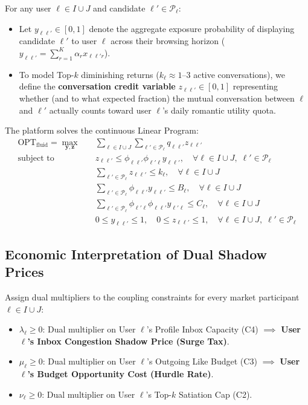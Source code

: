 \documentclass[11pt,letterpaper]{article}
\theoremstyle{definition}
\theoremstyle{plain}
\theoremstyle{remark}
\begin{document}
For any user $\ell \in I \cup J$ and candidate $\ell' \in \mathcal{P}_\ell$:
\begin{itemize}[leftmargin=1.5em]
    \item Let $y_{\ell\ell'} \in [0, 1]$ denote the aggregate exposure probability of displaying candidate $\ell'$ to user $\ell$ across their browsing horizon ($y_{\ell\ell'} = \sum_{r=1}^K \alpha_r x_{\ell\ell' r}$).
    \item To model Top-$k$ diminishing returns ($k_\ell \approx 1\text{--}3$ active conversations), we define the \textbf{conversation credit variable} $z_{\ell\ell'} \in [0, 1]$ representing whether (and to what expected fraction) the mutual conversation between $\ell$ and $\ell'$ actually counts toward user $\ell$'s daily romantic utility quota.
\end{itemize}

The platform solves the continuous Linear Program:
\begin{align}
    \mathrm{OPT}_{\text{fluid}} = \max_{\mathbf{y}, \mathbf{z}} \quad & \sum_{\ell \in I \cup J} \sum_{\ell' \in \mathcal{P}_\ell} q_{\ell\ell'} z_{\ell\ell'} \label{eq:fluid_obj} \\
    \text{subject to} \quad & z_{\ell\ell'} \le \phi_{\ell\ell'} \phi_{\ell'\ell} y_{\ell\ell'}, \quad \forall \ell \in I \cup J, \; \ell' \in \mathcal{P}_\ell \tag{C1: Realized Conversation Bound} \\
    & \sum_{\ell' \in \mathcal{P}_\ell} z_{\ell\ell'} \le k_\ell, \quad \forall \ell \in I \cup J \tag{C2: User Top-$k$ Satiation Cap} \\
    & \sum_{\ell' \in \mathcal{P}_\ell} \phi_{\ell\ell'} y_{\ell\ell'} \le B_\ell, \quad \forall \ell \in I \cup J \tag{C3: User Swiping Like Budget} \\
    & \sum_{\ell' \in \mathcal{P}_\ell} \phi_{\ell'\ell} \phi_{\ell\ell'} y_{\ell'\ell} \le C_\ell, \quad \forall \ell \in I \cup J \tag{C4: Profile Inbox Capacity} \\
    & 0 \le y_{\ell\ell'} \le 1, \quad 0 \le z_{\ell\ell'} \le 1, \quad \forall \ell \in I \cup J, \; \ell' \in \mathcal{P}_\ell
\end{align}

\subsection{Economic Interpretation of Dual Shadow Prices}
Assign dual multipliers to the coupling constraints for every market participant $\ell \in I \cup J$:
\begin{itemize}[leftmargin=2em]
    \item $\lambda_\ell \ge 0$: Dual multiplier on User $\ell$'s Profile Inbox Capacity (C4) $\implies$ \textbf{User $\ell$'s Inbox Congestion Shadow Price (Surge Tax)}.
    \item $\mu_\ell \ge 0$: Dual multiplier on User $\ell$'s Outgoing Like Budget (C3) $\implies$ \textbf{User $\ell$'s Budget Opportunity Cost (Hurdle Rate)}.
    \item $\nu_\ell \ge 0$: Dual multiplier on User $\ell$'s Top-$k$ Satiation Cap (C2).
\end{itemize}
\end{document}
